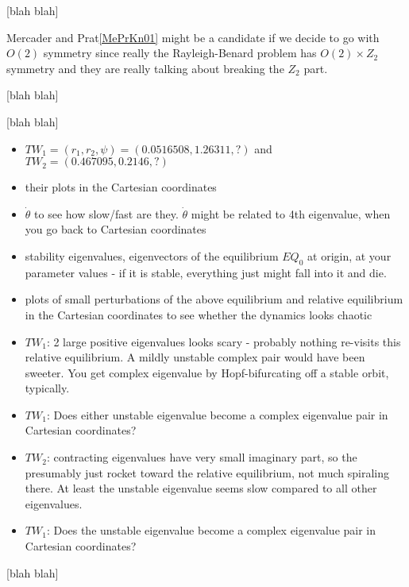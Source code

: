 \documentclass{article}
\begin{document}
 [blah blah]

Mercader and Prat\ref{MePrKn01} might
be a candidate if we decide to go with $O(2)$ symmetry since really the
Rayleigh-Benard problem has $O(2) \times Z_2$ symmetry and they are really
talking about breaking the $Z_2$ part.

 [blah blah]


 [blah blah]

\begin{itemize}
  \item $TW_1 = (r_1,r_2,\psi)=(0.0516508, 1.26311,?)$ and
        $TW_2 = (0.467095,0.2146,?)$
  \item their plots in the Cartesian coordinates
  \item $\dot{\theta}$ to see how slow/fast are they. $\dot{\theta}$
        might be related to 4th eigenvalue, when you go back
        to Cartesian coordinates
  \item stability eigenvalues, eigenvectors of the equilibrium $EQ_0$ at
        origin, at your parameter values - if it is stable, everything
        just might fall into it and die.
  \item plots of small perturbations of the above equilibrium and relative equilibrium in
        the Cartesian coordinates to see whether the dynamics looks
        chaotic
  \item $TW_1$: 2 large positive eigenvalues looks scary - probably
        nothing re-visits this relative equilibrium. A mildly unstable complex pair
        would have been sweeter. You get complex eigenvalue by Hopf-bifurcating off a
        stable orbit, typically.
  \item $TW_1$: Does either unstable eigenvalue become a complex
        eigenvalue pair in Cartesian coordinates?
  \item $TW_2$: contracting eigenvalues have very small imaginary
        part, so the presumably just rocket toward the relative equilibrium, not much
        spiraling there. At least the unstable eigenvalue seems slow
        compared to all other eigenvalues.
  \item $TW_1$: Does the unstable eigenvalue become a complex
        eigenvalue pair in Cartesian coordinates?
\end{itemize}

 [blah blah]
\end{document}
